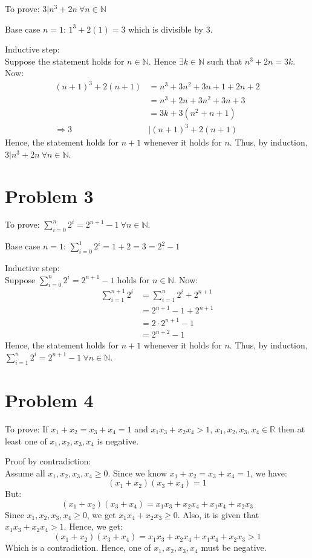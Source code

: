 \documentclass{article}
\begin{document}
  To prove: $3 | n^3 + 2n ~ \forall n \in \mathbb{N}$

  Base case $n = 1$: $1^3 + 2(1) = 3$ which is divisible by 3.

  Inductive step: \\
  Suppose the statement holds for $n \in \mathbb{N}$.
  Hence $\exists k \in \mathbb{N}$ such that $n^3 + 2n = 3k$.
  Now:
  \begin{align*}
    (n + 1)^3 + 2(n + 1) &= n^3 + 3n^2 + 3n + 1 + 2n + 2 \\
    &= n^3 + 2n + 3n^2 + 3n + 3 \\
    &= 3k + 3(n^2 + n + 1) \\
    \Rightarrow 3 &| (n + 1)^3 + 2(n + 1)
  \end{align*}
  Hence, the statement holds for $n + 1$ whenever it holds for $n$.
  Thus, by induction, $3 | n^3 + 2n ~ \forall n \in \mathbb{N}$.

\section{Problem 3}

  To prove: $\sum_{i=0}^{n} 2^i = 2^{n+1} - 1 ~ \forall n \in \mathbb{N}$.

  Base case $n = 1$: $\sum_{i=0}^{1} 2^i = 1 + 2 = 3 = 2^2 - 1$

  Inductive step: \\
  Suppose $\sum_{i=0}^{n} 2^i = 2^{n+1} - 1$ holds for $n \in \mathbb{N}$.
  Now:
  \begin{align*}
    \sum_{i=1}^{n+1} 2^i &= \sum_{i=1}^{n} 2^i + 2^{n+1} \\
    &= 2^{n+1} - 1 + 2^{n+1} \\
    &= 2 \cdot 2^{n+1} - 1 \\
    &= 2^{n+2} - 1
  \end{align*}
  Hence, the statement holds for $n + 1$ whenever it holds for $n$.
  Thus, by induction, $\sum_{i=1}^{n} 2^i = 2^{n+1} - 1 ~ \forall n \in \mathbb{N}$.

\section{Problem 4}

  To prove: If $x_1 + x_2 = x_3 + x_4 = 1$ and $x_1x_3 + x_2x_4 > 1$, $x_1, x_2, x_3, x_4 \in \mathbb{R}$ then at least one of $x_1, x_2, x_3, x_4$ is negative.

  Proof by contradiction: \\
  Assume all $x_1, x_2, x_3, x_4 \geq 0$.
  Since we know $x_1 + x_2 = x_3 + x_4 = 1$, we have:
  \[ (x_1 + x_2)(x_3 + x_4) = 1 \]
  But:
  \[ (x_1 + x_2)(x_3 + x_4) = x_1x_3 + x_2x_4 + x_1x_4 + x_2x_3 \]
  Since $x_1, x_2, x_3, x_4 \geq 0$, we get $x_1x_4 + x_2x_3 \geq 0$.
  Also, it is given that $x_1x_3 + x_2x_4 > 1$.
  Hence, we get:
  \[ (x_1 + x_2)(x_3 + x_4) = x_1x_3 + x_2x_4 + x_1x_4 + x_2x_3 > 1 \]
  Which is a contradiction.
  Hence, one of $x_1, x_2, x_3, x_4$ must be negative.
\end{document}
